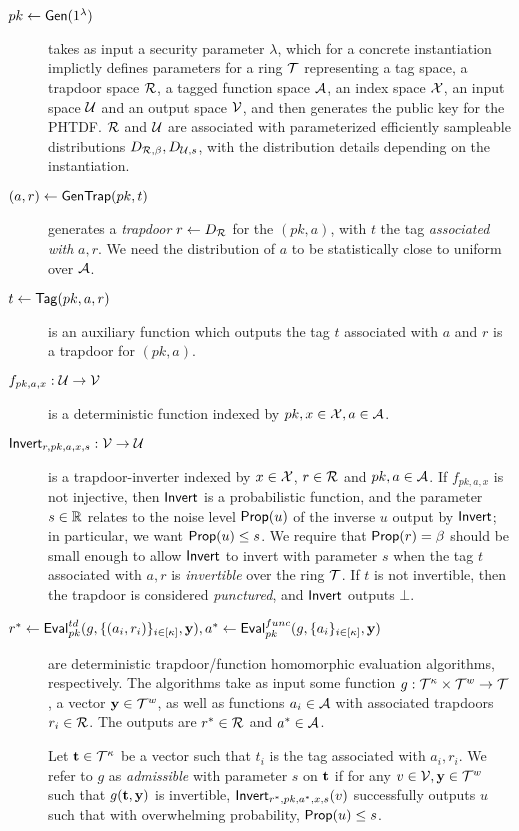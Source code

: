 \begin{description}
\item[$pk \gets \mathsf{Gen}(1^{\lambda})$] takes
  as input a security parameter $\lambda$, which for a concrete
  instantiation implictly defines parameters for a ring $\mathcal{T}$ representing a tag space, a trapdoor space
  $\mathcal{R}$, a tagged function space $\mathcal{A}$, an index space $\mathcal{X}$, an
  input space $\mathcal{U}$ and an output space $\mathcal{V}$, and then generates
  the public key for the PHTDF.  $\mathcal{R}$ and $\mathcal{U}$ are associated with
  parameterized efficiently sampleable distributions
  $D_{\mathcal{R},\beta}, D_{\mathcal{U},s}$, with the distribution details
  depending on the instantiation. 
\item[$(a,r) \gets \mathsf{GenTrap}(pk,t)$] generates a \emph{trapdoor} $r \gets
  D_{\mathcal{R}}$ for the $(pk,a)$, with $t$ the tag \emph{associated
  with} $a,r$. We need the
  distribution of $a$ to be statistically close to uniform over
  $\mathcal{A}$. 
\item[$t \gets \mathsf{Tag}(pk,a,r)$] is an auxiliary function which
  outputs the tag $t$ associated with $a$ and $r$ is a trapdoor
  for $(pk,a)$. 
\item[$f_{pk,a,x} : \mathcal{U} \to \mathcal{V}$] is a deterministic 
function indexed by $pk,x \in \mathcal{X},a \in \mathcal{A}$. 
\item[$\mathsf{Invert}_{r,pk,a,x,s} : \mathcal{V} \to \mathcal{U}$] is a trapdoor-inverter
  indexed by $x \in \mathcal{X}$, $r \in \mathcal{R}$ and $pk,a \in \mathcal{A}$. If
  $f_{pk,a,x}$ is not injective, then $\mathsf{Invert}$ is a probabilistic
  function, and the parameter $s \in \mathbb{R}$ relates to the noise level $\mathsf{Prop}(u)$ of
  the inverse $u$ output by $\mathsf{Invert}$; in particular, we want
  $\mathsf{Prop}(u) \leq s$. We require that $\mathsf{Prop}(r)=\beta$ should be small
  enough to allow $\mathsf{Invert}$ to invert with parameter $s$ when the tag
  $t$ associated with $a,r$ is \emph{invertible} over the ring
  $\mathcal{T}$. If $t$ is not invertible, then the trapdoor is considered
  \emph{punctured}, and $\mathsf{Invert}$ outputs $\bot$.
\item[$r^* \gets
  \mathsf{Eval}_{pk}^{td}(g,\{(a_i,r_i)\}_{i \in [\kappa]},\mathbf{y}),
  a^* \gets \mathsf{Eval}_{pk}^{func}(g,\{a_i\}_{i \in [\kappa]},\mathbf{y})$] are
  deterministic trapdoor/function homomorphic evaluation algorithms, respectively.
  The algorithms take as input some function $g: \mathcal{T}^{\kappa} \times
  \mathcal{T}^{w} \to
  \mathcal{T}$, a vector $\mathbf{y} \in \mathcal{T}^{w}$, as well as functions $a_i
  \in \mathcal{A}$ with associated trapdoors $r_i \in \mathcal{R}$. The outputs are $r^* \in \mathcal{R}$ and
  $a^* \in \mathcal{A}$.

Let $\mathbf{t} \in \mathcal{T}^{\kappa}$ be a vector
such that $t_i$ is the tag associated with $a_i,r_i$. We refer to $g$ as
  \emph{admissible} with parameter $s$ on $\mathbf{t}$ if for any $v
  \in \mathcal{V},\mathbf{y} \in \mathcal{T}^{w}$ such that $g(\mathbf{t},\mathbf{y})$ is invertible,
$\mathsf{Invert}_{r^*,pk,a^*,x,s}(v)$ successfully outputs $u$ such that with
overwhelming probability, $\mathsf{Prop}(u) \leq s$.
\end{description} 

